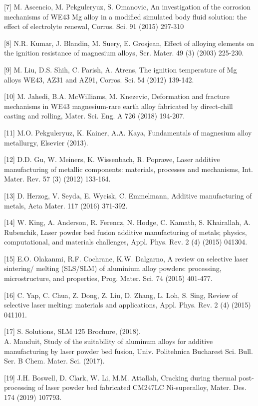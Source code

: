 \documentclass[10pt]{article}
\begin{document}
[7] M. Ascencio, M. Pekguleryuz, S. Omanovic, An investigation of the corrosion mechanisms of WE43 Mg alloy in a modified simulated body fluid solution: the effect of electrolyte renewal, Corros. Sci. 91 (2015) 297-310

[8] N.R. Kumar, J. Blandin, M. Suery, E. Grosjean, Effect of alloying elements on the ignition resistance of magnesium alloys, Scr. Mater. 49 (3) (2003) 225-230.

[9] M. Liu, D.S. Shih, C. Parish, A. Atrens, The ignition temperature of Mg alloys WE43, AZ31 and AZ91, Corros. Sci. 54 (2012) 139-142.

[10] M. Jahedi, B.A. McWilliams, M. Knezevic, Deformation and fracture mechanisms in WE43 magnesium-rare earth alloy fabricated by direct-chill casting and rolling, Mater. Sci. Eng. A 726 (2018) 194-207.

[11] M.O. Pekguleryuz, K. Kainer, A.A. Kaya, Fundamentals of magnesium alloy metallurgy, Elsevier (2013).

[12] D.D. Gu, W. Meiners, K. Wissenbach, R. Poprawe, Laser additive manufacturing of metallic components: materials, processes and mechanisms, Int. Mater. Rev. 57 (3) (2012) 133-164.

[13] D. Herzog, V. Seyda, E. Wycisk, C. Emmelmann, Additive manufacturing of metals, Acta Mater. 117 (2016) 371-392.

[14] W. King, A. Anderson, R. Ferencz, N. Hodge, C. Kamath, S. Khairallah, A. Rubenchik, Laser powder bed fusion additive manufacturing of metals; physics, computational, and materials challenges, Appl. Phys. Rev. 2 (4) (2015) 041304.

[15] E.O. Olakanmi, R.F. Cochrane, K.W. Dalgarno, A review on selective laser sintering/ melting (SLS/SLM) of aluminium alloy powders: processing, microstructure, and properties, Prog. Mater. Sci. 74 (2015) 401-477.

[16] C. Yap, C. Chua, Z. Dong, Z. Liu, D. Zhang, L. Loh, S. Sing, Review of selective laser melting: materials and applications, Appl. Phys. Rev. 2 (4) (2015) 041101.

[17] S. Solutions, SLM 125 Brochure, (2018).\\
[18] A. Mauduit, Study of the suitability of aluminum alloys for additive manufacturing by laser powder bed fusion, Univ. Politehnica Bucharest Sci. Bull. Ser. B Chem. Mater. Sci. (2017).

[19] J.H. Boswell, D. Clark, W. Li, M.M. Attallah, Cracking during thermal post-processing of laser powder bed fabricated CM247LC Ni-superalloy, Mater. Des. 174 (2019) 107793.
\end{document}
